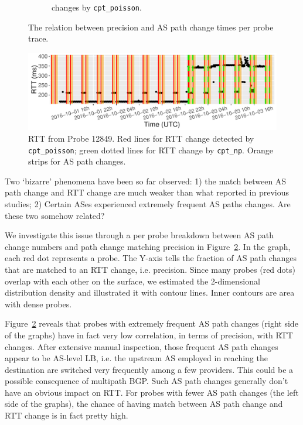 \begin{figure}[!htb]
\begin{subfigure}[b]{.48\textwidth}
	\caption{\footnotesize changes by \texttt{cpt\_poisson}.}
	\label{fig:as_path_ch_precision_poisson}
	\end{subfigure}
\caption{The relation between precision and AS path change times per probe trace.}
\label{fig:as_path_ch_precision}
\end{figure}

\begin{figure}[!htb]
\centering
\includegraphics[width=.96\textwidth]{gfx/chap4/case_12849.pdf}
\caption{RTT from Probe 12849. Red lines for RTT change detected by \texttt{cpt\_poisson}; green dotted lines for RTT change by \texttt{cpt\_np}. Orange strips for AS path changes.}
\label{fig:case_12849_rtt}
\end{figure}

Two `bizarre' phenomena have been so far observed: 1) the match between AS path change and RTT change are much weaker than what reported in previous studies; 2) Certain ASes experienced extremely frequent AS paths changes.
Are these two somehow related?

We investigate this issue through a per probe breakdown between AS path change numbers and path change matching precision in Figure~\ref{fig:as_path_ch_precision}.
In the graph, each red dot represents a probe. The Y-axis tells the fraction of AS path changes that are matched to an RTT change, i.e. precision.
Since many probes (red dots) overlap with each other on the surface, we estimated the 2-dimensional distribution density and illustrated it with contour lines.
Inner contours are area with dense probes.

Figure~\ref{fig:as_path_ch_precision} reveals that probes with extremely frequent AS path changes (right side of the graphs) have in fact very low correlation, in terms of precision, with RTT changes.
After extensive manual inspection, those frequent AS path changes appear to be AS-level LB, i.e. the upstream AS employed in reaching the destination are switched very frequently among a few providers.
This could be a possible consequence of multipath BGP.
Such AS path changes generally don't have an obvious impact on RTT. 
For probes with fewer AS path changes (the left side of the graphs), the chance of having match between AS path change and RTT change is in fact pretty high.

